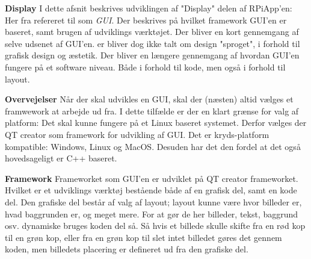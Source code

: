 \documentclass[Softwaredesign/Softwaredesign_main.tex]{subfiles}
\begin{document}
\textbf{Display}
I dette afsnit beskrives udviklingen af "Display" delen af RPiApp'en: Her fra refereret til som \textit{GUI}. Der beskrives på hvilket framework GUI'en er baseret, samt brugen af udviklings værktøjet. Der bliver en kort gennemgang af selve udsenet af GUI'en.  er bliver dog ikke talt om design "sproget", i forhold til grafisk design og æstetik. Der bliver en længere gennemgang af hvordan GUI'en fungere på et software niveau. Både i forhold til kode, men også i forhold til layout.

\textbf{Overvejelser}
Når der skal udvikles en GUI, skal der (næsten) altid vælges et framwework at arbejde ud fra. I dette tilfælde er der en klart grænse for valg af platform: Det skal kunne fungere på et Linux baseret systemet. Derfor vælges der QT creator som framework for udvikling af GUI. Det er kryds-platform kompatible: Windows, Linux og MacOS. Desuden har det den fordel at det også hovedsageligt er C++ baseret. 

\textbf{Framework}
Frameworket som GUI'en er udviklet på QT creator frameworket. Hvilket er et udviklings værktøj bestående både af en grafisk del, samt en kode del. Den grafiske del består af valg af layout; layout kunne være hvor billeder er, hvad baggrunden er, og meget mere. For at gør de her billeder, tekst, baggrund osv. dynamiske bruges koden del så. Så hvis et billede skulle skifte fra en rød kop til en grøn kop, eller fra en grøn kop til slet intet billedet gøres det gennem koden, men billedets placering er defineret ud fra den grafiske del. 
\end{document}

